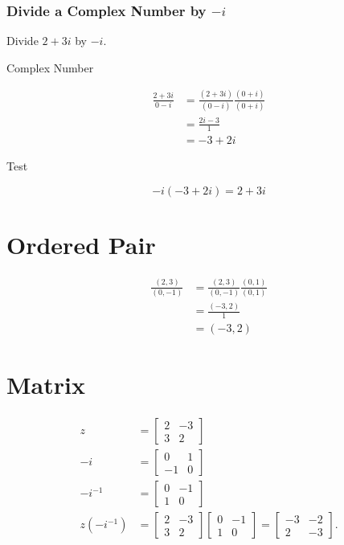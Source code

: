 \documentclass[10pt]{article}
\begin{document}
\subsubsection{Divide a Complex Number by $-i$}
Divide $2+3 i$ by $-i$.

Complex Number

$$
\begin{aligned}
\frac{2+3 i}{0-i} & =\frac{(2+3 i)}{(0-i)} \frac{(0+i)}{(0+i)} \\
& =\frac{2 i-3}{1} \\
& =-3+2 i
\end{aligned}
$$

Test

$$
-i(-3+2 i)=2+3 i
$$

\section{Ordered Pair}
$$
\begin{aligned}
\frac{(2,3)}{(0,-1)} & =\frac{(2,3)}{(0,-1)} \frac{(0,1)}{(0,1)} \\
& =\frac{(-3,2)}{1} \\
& =(-3,2)
\end{aligned}
$$

\section{Matrix}
$$
\begin{aligned}
z & =\left[\begin{array}{cc}
2 & -3 \\
3 & 2
\end{array}\right] \\
-i & =\left[\begin{array}{cc}
0 & 1 \\
-1 & 0
\end{array}\right] \\
-i^{-1} & =\left[\begin{array}{cc}
0 & -1 \\
1 & 0
\end{array}\right] \\
z\left(-i^{-1}\right) & =\left[\begin{array}{cc}
2 & -3 \\
3 & 2
\end{array}\right]\left[\begin{array}{cc}
0 & -1 \\
1 & 0
\end{array}\right]=\left[\begin{array}{cc}
-3 & -2 \\
2 & -3
\end{array}\right] .
\end{aligned}
$$
\end{document}
